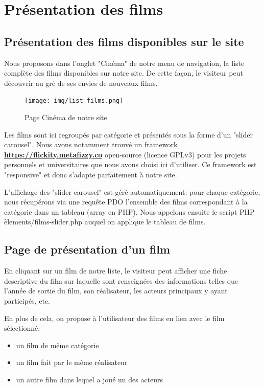 \chapter{Présentation des films} %


    \section{Présentation des films disponibles sur le site} 

        Nous proposons dans l'onglet "Cinéma" de notre menu de navigation, la liste complète des films disponibles sur notre site. De cette façon, le visiteur peut découvrir au gré de ses envies de nouveaux films.

        \begin{figure}[!ht]
            \centering
            \texttt{[image: img/list-films.png]}
            \caption{Page Cinéma de notre site}
        \end{figure}

        \medskip
        Les films sont ici regroupés par catégorie et présentés sous la forme d'un "slider carousel". Nous avons notamment trouvé un framework {\bfseries \href{Flickity}{https://flickity.metafizzy.co} } open-source (licence GPLv3) pour les projets personnels et universitaires que nous avons choisi ici d'utiliser. Ce framework est "responsive" et donc s'adapte parfaitement à notre site.

        \medskip
        L'affichage des "slider carousel" est géré automatiquement: pour chaque catégorie, nous récupérons via une requête PDO l'ensemble des films correspondant à la catégorie dans un tableau (array en PHP). Nous appelons ensuite le script PHP \f{elements/films-slider.php} auquel on applique le tableau de films. 

        \bigskip
        \section{Page de présentation d'un film}


            En cliquant sur un film de notre liste, le visiteur peut afficher une fiche descriptive du film sur laquelle sont renseignées des informations telles que l'année de sortie du film, son réalisateur, les acteurs principaux y ayant participés, etc.

            \medskip
            En plus de cela,  on propose à l'utilisateur des films en lien avec le film sélectionné:
                \begin{itemize}
                    \item un film de même catégorie
                    \item un film fait par le même réalisateur
                    \item un autre film dans lequel a joué un des acteurs
                \end{itemize}

